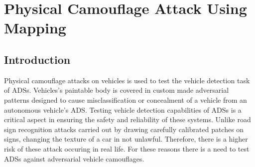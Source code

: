 \documentclass[a4paper]{article}
\begin{document}
\pagebreak


\section{Physical Camouflage Attack Using Mapping} \label{sec:camouflage}

\subsection{Introduction}
Physical camouflage attacks on vehicles is used to test the vehicle detection task of ADSs. Vehicles's paintable body is covered in custom made adversarial patterns designed to cause misclassification or concealment of a vehicle from an autonomous vehicle's ADS. 
Testing vehicle detection capabilities of ADSs is a critical aspect in ensuring the safety and reliability of these systems. Unlike road sign recognition attacks carried out by drawing carefully calibrated patches on signs, changing the texture of a car in not unlawful. Therefore, there is a higher risk of these attack occuring in real life. For these reasons there is a need to test ADSs against adversarial vehicle camouflages.
\end{document}
